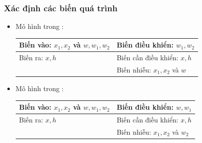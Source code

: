 \subsubsection{Xác định các biến quá trình}
    \begin{itemize}
        \item Mô hình trong \fig{\ref{Fig:binhchuachatlong-khuaytron-mohinh1}}:
            \begin{center}
                \begin{tabular}{l|l}
                    Biến vào: $x_1, x_2$ và $w, w_1, w_2$ & Biến điều khiển: $w_1,w_2$ \\ \hline
                    Biến ra: $x,h$ & Biến cần điều khiển: $x,h$\\ \hline
                    & Biến nhiễu: $x_1, x_2$ và $w$
                \end{tabular}
            \end{center}

        \item Mô hình trong \fig{\ref{Fig:binhchuachatlong-khuaytron-mohinh2}}:
            \begin{center}
                \begin{tabular}{l|l}
                    Biến vào: $x_1, x_2$ và $w, w_1, w_2$ & Biến điều khiển: $w, w_1$ \\ \hline
                    Biến ra: $x,h$ & Biến cần điều khiển: $x,h$\\ \hline
                    & Biến nhiễu: $x_1, x_2$ và $w_2$
                \end{tabular}
            \end{center}
    \end{itemize}

